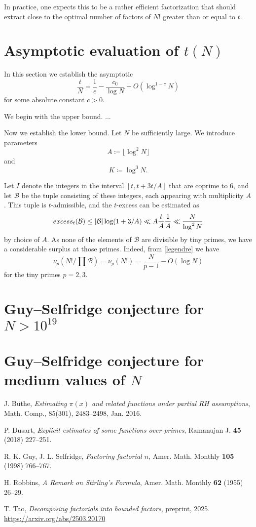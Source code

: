 \documentclass[12pt,a4paper,reqno]{amsart}
\numberwithin{equation}{section}
\theoremstyle{plain}
\theoremstyle{definition}
\newcommand\tuple{{\mathcal B}}
\newcommand\excess{{\mathrm{E}}}
\begin{document}
In practice, one expects this to be a rather efficient factorization that should extract close to the optimal number of factors of $N!$ greater than or equal to $t$.

\section{Asymptotic evaluation of $t(N)$}

In this section we establish the asymptotic
$$ \frac{t}{N} = \frac{1}{e} - \frac{c_0}{\log N} + O(\log^{1-c} N)$$
for some absolute constant $c>0$.

We begin with the upper bound.  
...

Now we establish the lower bound.  Let $N$ be sufficiently large.  We introduce parameters
$$ A \coloneqq \lfloor \log^2 N \rfloor$$
and
$$ K \coloneqq \log^3 N.$$

Let $I$ denote the integers in the interval $[t, t+3t/A]$ that are coprime to $6$, and let $\tuple$ be the tuple consisting of these integers, each appearing with multiplicity $A$.  This tuple is $t$-admissible, and the $t$-excess can be estimated as
$$ \\excess_t(\tuple) \leq |\tuple| \log(1+3/A) \ll A \frac{t}{A} \frac{1}{A} \ll \frac{N}{\log^2 N}$$
by choice of $A$.  As none of the elements of $\tuple$ are divisible by tiny primes, we have a considerable surplus at those primes.  Indeed, from \eqref{legendre} we have
$$ \nu_p(N!/\prod \tuple) = \nu_p(N!) = \frac{N}{p-1} - O(\log N)$$
for the tiny primes $p=2,3$.





\section{Guy--Selfridge conjecture for $N > 10^{19}$}


\section{Guy--Selfridge conjecture for medium values of $N$}



\begin{thebibliography}{10}

J. B\"uthe, \emph{Estimating $\pi(x)$ and related functions under partial RH assumptions}, Math. Comp., 85(301), 2483--2498, Jan. 2016.

P. Dusart, \emph{Explicit estimates of some functions over primes}, Ramanujan J. \textbf{45} (2018) 227--251.

R. K. Guy, J. L. Selfridge, \emph{Factoring factorial $n$}, Amer. Math. Monthly \textbf{105} (1998) 766--767.

H. Robbins, \emph{A Remark on Stirling's Formula}, Amer. Math. Monthly \textbf{62} (1955) 26--29.

T. Tao, \emph{Decomposing factorials into bounded factors}, preprint, 2025. \url{https://arxiv.org/abs/2503.20170}

\end{thebibliography}
\end{document}
